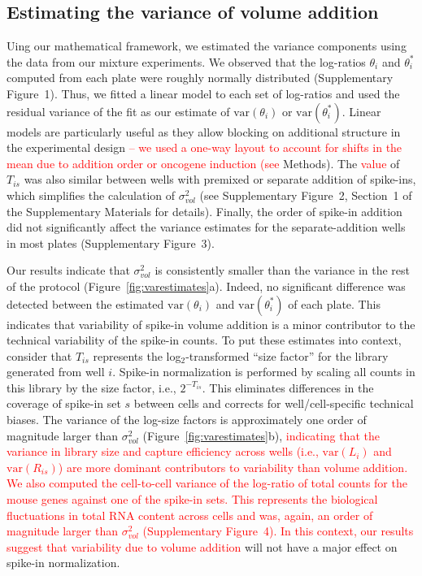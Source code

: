 \documentclass{article}
\newcommand{\suppfignorm}{1}
\newcommand{\suppfigtotals}{2}
\newcommand{\suppfigorder}{3}
\newcommand{\suppfigcell}{4}
\newcommand{\suppsecmath}{1}
\newcommand{\revised}[1]{\textcolor{red}{#1}}
\newcommand\variance{\mbox{var}}
\begin{document}
\subsection*{Estimating the variance of volume addition}
Uing our mathematical framework, we estimated the variance components using the data from our mixture experiments.
We observed that the log-ratios $\theta_i$ and $\theta^*_i$ computed from each plate were roughly normally distributed (Supplementary Figure~\suppfignorm{}).
Thus, we fitted a linear model to each set of log-ratios and used the residual variance of the fit as our estimate of $\variance(\theta_i)$ or $\variance(\theta^*_i)$.
Linear models are particularly useful as they allow blocking on additional structure in the experimental design \revised{-- we used a one-way layout to account for shifts in the mean due to addition order or oncogene induction (see} Methods).
The \revised{value} of $T_{is}$ was also similar between wells with premixed or separate addition of spike-ins, which simplifies the calculation of $\sigma^2_{vol}$ (see Supplementary Figure~\suppfigtotals{}, Section~\suppsecmath{} of the Supplementary Materials for details).
Finally, the order of spike-in addition did not significantly affect the variance estimates for the separate-addition wells in most plates (Supplementary Figure~\suppfigorder{}).

Our results indicate that $\sigma^2_{vol}$ is consistently smaller than the variance in the rest of the protocol (Figure~\ref{fig:varestimates}a).
Indeed, no significant difference was detected between the estimated $\variance(\theta_i)$ and $\variance(\theta^*_i)$ of each plate.
This indicates that variability of spike-in volume addition is a minor contributor to the technical variability of the spike-in counts.
To put these estimates into context, consider that $T_{is}$ represents the log$_2$-transformed ``size factor'' for the library generated from well $i$.
Spike-in normalization is performed by scaling all counts in this library by the size factor, i.e., $2^{-T_{is}}$.
This eliminates differences in the coverage of spike-in set $s$ between cells and corrects for well/cell-specific technical biases.
The variance of the log-size factors is approximately one order of magnitude larger than $\sigma^2_{vol}$ (Figure~\ref{fig:varestimates}b), \revised{indicating that the variance in library size and capture efficiency across wells (i.e., $\variance{(L_{i})}$ and $\variance{(R_{is})}$) are more dominant contributors to variability than volume addition.
We also computed the cell-to-cell variance of the log-ratio of total counts for the mouse genes against one of the spike-in sets.
This represents the biological fluctuations in total RNA content across cells and was, again, an order of magnitude larger than $\sigma^2_{vol}$ (Supplementary Figure~\suppfigcell{}).
In this context, our results suggest that variability due to volume addition} will not have a major effect on spike-in normalization.
\end{document}
